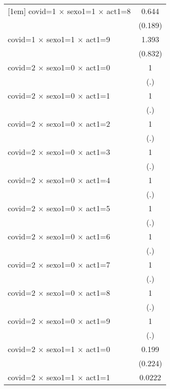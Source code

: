 {\begin{tabular}{l*{1}{c}}
[1em]
covid=1 $\times$ sexo1=1 $\times$ act1=8&       0.644         \\
                    &     (0.189)         \\
[1em]
covid=1 $\times$ sexo1=1 $\times$ act1=9&       1.393         \\
                    &     (0.832)         \\
[1em]
covid=2 $\times$ sexo1=0 $\times$ act1=0&           1         \\
                    &         (.)         \\
[1em]
covid=2 $\times$ sexo1=0 $\times$ act1=1&           1         \\
                    &         (.)         \\
[1em]
covid=2 $\times$ sexo1=0 $\times$ act1=2&           1         \\
                    &         (.)         \\
[1em]
covid=2 $\times$ sexo1=0 $\times$ act1=3&           1         \\
                    &         (.)         \\
[1em]
covid=2 $\times$ sexo1=0 $\times$ act1=4&           1         \\
                    &         (.)         \\
[1em]
covid=2 $\times$ sexo1=0 $\times$ act1=5&           1         \\
                    &         (.)         \\
[1em]
covid=2 $\times$ sexo1=0 $\times$ act1=6&           1         \\
                    &         (.)         \\
[1em]
covid=2 $\times$ sexo1=0 $\times$ act1=7&           1         \\
                    &         (.)         \\
[1em]
covid=2 $\times$ sexo1=0 $\times$ act1=8&           1         \\
                    &         (.)         \\
[1em]
covid=2 $\times$ sexo1=0 $\times$ act1=9&           1         \\
                    &         (.)         \\
[1em]
covid=2 $\times$ sexo1=1 $\times$ act1=0&       0.199         \\
                    &     (0.224)         \\
[1em]
covid=2 $\times$ sexo1=1 $\times$ act1=1&      0.0222\sym{***}\\

\end{tabular}}
